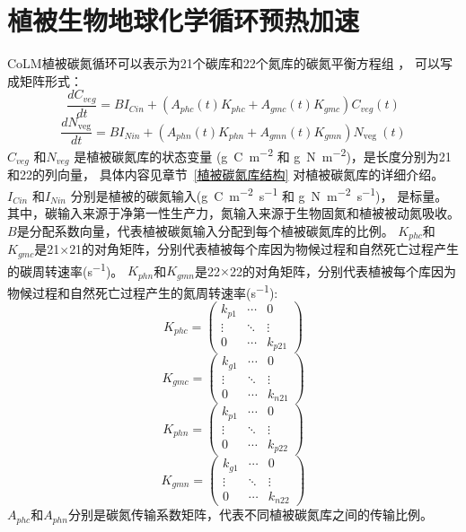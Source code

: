 \section{植被生物地球化学循环预热加速}
CoLM植被碳氮循环可以表示为21个碳库和22个氮库的碳氮平衡方程组 \citep{lu2020full}，
可以写成矩阵形式：
\begin{equation}
\frac{d C_{veg}}{dt}=B I_{Cin}+\left(A_{p h c}(t) K_{p h c}+A_{gmc}(t) K_{gmc}\right) C_{veg}(t)
\end{equation}
\begin{equation}
\frac{d N_{\text {veg}}}{dt}=B I_{Nin}+\left(A_{phn}(t) K_{phn}+A_{gmn}(t) K_{gmn}\right) N_{\text {veg }}(t)
\end{equation}
$C_{veg}$ 和$N_{veg}$ 是植被碳氮库的状态变量 (\unit{g.C.m^{-2}} 和 \unit{g.N.m^{-2}})，是长度分别为21和22的列向量，
具体内容见章节~\ref{植被碳氮库结构} 对植被碳氮库的详细介绍。$I_{Cin}$ 和$I_{Nin}$ 分别是植被的碳氮输入(\unit{g.C.m^{-2}.s^{-1}} 和 \unit{g.N.m^{-2}.s^{-1}})，
是标量。其中，碳输入来源于净第一性生产力，氮输入来源于生物固氮和植被被动氮吸收。
$B$是分配系数向量，代表植被碳氮输入分配到每个植被碳氮库的比例。  
$K_{phc}$和$K_{gmc}$是21$\times$21的对角矩阵，分别代表植被每个库因为物候过程和自然死亡过程产生的碳周转速率(\unit{s^{-1}})。
$K_{phn}$和$K_{gmn}$是22$\times$22的对角矩阵，分别代表植被每个库因为物候过程和自然死亡过程产生的氮周转速率(\unit{s^{-1}}):
\begin{equation}
K_{p h c}=\left(\begin{array}{ccc}k_{p 1} & \cdots & 0 \\ \vdots & \ddots & \vdots \\ 0 & \cdots & k_{p 21}\end{array}\right)
\end{equation}
\begin{equation}
K_{gmc}=\left(\begin{array}{ccc}k_{g 1} & \cdots & 0 \\ \vdots & \ddots & \vdots \\ 0 & \cdots & k_{n 21}\end{array}\right)
\end{equation}
\begin{equation}
K_{phn}=\left(\begin{array}{ccc}k_{p 1} & \cdots & 0 \\ \vdots & \ddots & \vdots \\ 0 & \cdots & k_{p 22}\end{array}\right)
\end{equation}
\begin{equation}
K_{gmn}=\left(\begin{array}{ccc}k_{g 1} & \cdots & 0 \\ \vdots & \ddots & \vdots \\ 0 & \cdots & k_{n 22}\end{array}\right)
\end{equation}
$A_{phc}$和$A_{phn}$分别是碳氮传输系数矩阵，代表不同植被碳氮库之间的传输比例。

